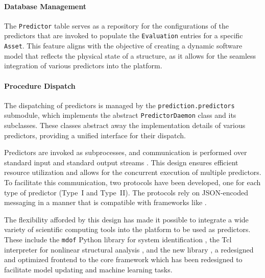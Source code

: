 \paragraph{Database Management}

The \texttt{Predictor} table serves as a repository for the configurations of the predictors that are invoked to populate the \texttt{Evaluation} entries for a specific \texttt{Asset}. This feature aligns with the objective of creating a dynamic software model that reflects the physical state of a structure, as it allows for the seamless integration of various predictors into the platform.

\paragraph{Procedure Dispatch}

The dispatching of predictors is managed by the \texttt{prediction.predictors} submodule, which implements the abstract \texttt{PredictorDaemon} class and its subclasses. These classes abstract away the implementation details of various predictors, providing a unified interface for their dispatch.

Predictors are invoked as subprocesses, and communication is performed over standard input and standard output streams \citep{silberschatz2018operating}. 
This design ensures efficient resource utilization and allows for the concurrent execution of multiple predictors. 
To facilitate this communication, two protocols have been developed, one for each type of predictor (Type~I and Type~II). 
The protocols rely on JSON-encoded messaging in a manner that is compatible with frameworks like  \cite{deierlein2020cloudenabled,deierlein2021state}.  

The flexibility afforded by this design has made it possible to integrate a wide variety of scientific computing tools into the platform to be used as predictors. 
These include the \texttt{mdof} Python library for system identification \citep{chern2024mdof}, the \OpenSees{} Tcl interpreter for nonlinear structural analysis \citep{mckenna1997object}, and the new \Xara{} library \citep{perez2024xara}, a redesigned and optimized frontend to the core \OpenSees{} framework which has been redesigned to facilitate model updating and machine learning tasks. 

